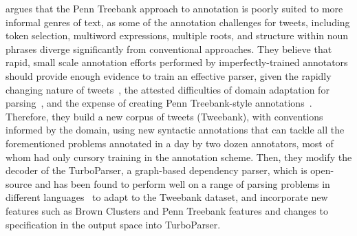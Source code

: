 \documentclass[11pt,letterpaper]{article}
\begin{document}
 argues that the Penn Treebank approach to annotation is poorly suited to more informal genres of text, as some of the annotation challenges for tweets,
including token selection, multiword expressions, multiple roots, and structure within noun phrases diverge significantly from conventional approaches. 
They believe that rapid, small scale annotation efforts performed by imperfectly-trained annotators should provide enough evidence to train an effective parser, given the rapidly changing nature of tweets~\cite{eisenstein:2013:NAACL-HLT}, the attested difficulties of domain adaptation for parsing~\cite{dred07}, and the expense of creating Penn Treebank-style annotations~\cite{penn93}. 
Therefore, they build a new corpus of tweets (Tweebank), with conventions informed by the domain, using new syntactic annotations that can tackle all the forementioned problems annotated in a day by two dozen annotators, most of whom had only cursory training in the annotation scheme. Then, they modify the decoder of the TurboParser, a graph-based dependency parser, which is open-source and has been found to perform well on a range of parsing problems in different languages~\cite{turbo13} to adapt to the Tweebank dataset, and incorporate new features such as Brown Clusters and Penn Treebank features and changes to specification
in the output space into TurboParser.
\end{document}
